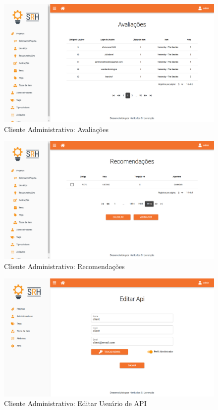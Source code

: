 \begin{figure}[H]
	\centering
	\includegraphics[width=.9\linewidth]{imagens/adminAvaliacoes.png}
	\caption[Cliente Administrativo: Avaliações]{Cliente Administrativo: Avaliações}
    \label{fig:clienteAdminAvaliacoes}
\end{figure}

\begin{figure}[H]
	\centering
	\includegraphics[width=.9\linewidth]{imagens/adminRecomendacoes.png}
	\caption[Cliente Administrativo: Recomendações]{Cliente Administrativo: Recomendações}
    \label{fig:clienteAdminRecomendacoes}
\end{figure}

\begin{figure}[H]
	\centering
	\includegraphics[width=.9\linewidth]{imagens/adminApi.png}
	\caption[Cliente Administrativo - Login]{Cliente Administrativo: Editar Usuário de API}
    \label{fig:clienteAdminUsuarioAPI}
\end{figure}

